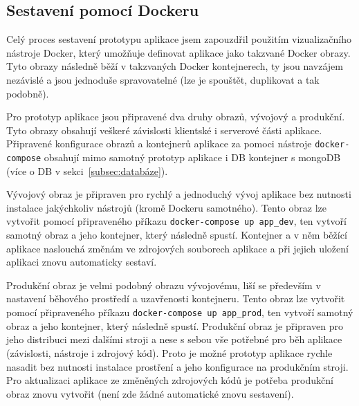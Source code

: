 \subsection{Sestavení pomocí Dockeru}\label{subsec:sestaveníPomocíDockeru}

Celý proces sestavení prototypu aplikace jsem zapouzdřil použitím vizualizačního nástroje Docker, který umožňuje definovat aplikace jako takzvané Docker obrazy.
Tyto obrazy následně běží v takzvaných Docker kontejnerech, ty jsou navzájem nezávislé a jsou jednoduše spravovatelné (lze je spouštět, duplikovat a tak podobně).

Pro prototyp aplikace jsou připravené dva druhy obrazů, vývojový a produkční.
Tyto obrazy obsahují veškeré závislosti klientské i serverové části aplikace.
Připravené konfigurace obrazů a kontejnerů aplikace za pomoci nástroje \texttt{docker-compose} obsahují mimo samotný prototyp aplikace i DB kontejner s mongoDB (více o DB v sekci~\ref{subsec:databáze}).

Vývojový obraz je připraven pro rychlý a jednoduchý vývoj aplikace bez nutnosti instalace jakýchkoliv nástrojů (kromě Dockeru samotného).
Tento obraz lze vytvořit pomocí připraveného příkazu \texttt{docker-compose up app_dev}, ten vytvoří samotný obraz a jeho kontejner, který následně spustí.
Kontejner a v něm běžící aplikace naslouchá změnám ve zdrojových souborech aplikace a při jejich uložení aplikaci znovu automaticky sestaví.

Produkční obraz je velmi podobný obrazu vývojovému, liší se především v nastavení běhového prostředí a uzavřenosti kontejneru.
Tento obraz lze vytvořit pomocí připraveného příkazu \texttt{docker-compose up app_prod}, ten vytvoří samotný obraz a jeho kontejner, který následně spustí.
Produkční obraz je připraven pro jeho distribuci mezi dalšími stroji a nese s sebou vše potřebné pro běh aplikace (závislosti, nástroje i zdrojový kód).
Proto je možné prototyp aplikace rychle nasadit bez nutnosti instalace prostření a jeho konfigurace na produkčním stroji.
Pro aktualizaci aplikace ze změněných zdrojových kódů je potřeba produkční obraz znovu vytvořit (není zde žádné automatické znovu sestavení).
